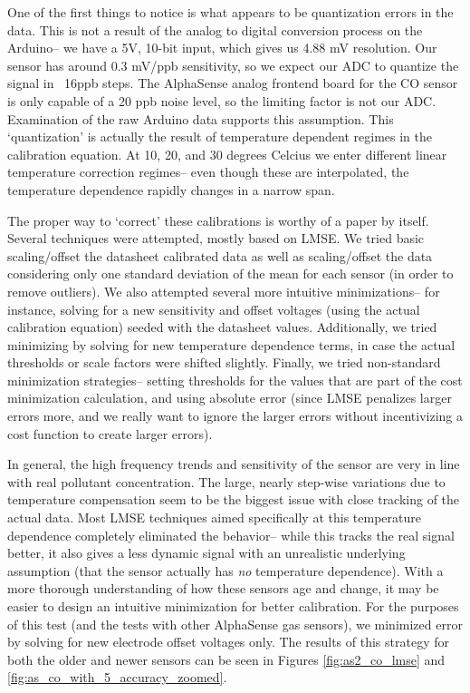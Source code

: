 One of the first things to notice is what appears to be quantization errors in the data.  This is not a result of the analog to digital conversion process on the Arduino-- we have a 5V, 10-bit input, which gives us 4.88 mV resolution.  Our sensor has around 0.3 mV/ppb sensitivity, so we expect our ADC to quantize the signal in ~16ppb steps.  The AlphaSense analog frontend board for the CO sensor is only capable of a 20 ppb noise level, so the limiting factor is not our ADC.  Examination of the raw Arduino data supports this assumption.  This `quantization' is actually the result of temperature dependent regimes in the calibration equation.  At 10, 20, and 30 degrees Celcius we enter different linear temperature correction regimes-- even though these are interpolated, the temperature dependence rapidly changes in a narrow span.

The proper way to `correct' these calibrations is worthy of a paper by itself.  Several techniques were attempted, mostly based on LMSE.  We tried basic scaling/offset the datasheet calibrated data as well as scaling/offset the data considering only one standard deviation of the mean for each sensor (in order to remove outliers).  We also attempted several more intuitive minimizations-- for instance, solving for a new sensitivity and offset voltages (using the actual calibration equation) seeded with the datasheet values.  Additionally, we tried minimizing by solving for new temperature dependence terms, in case the actual thresholds or scale factors were shifted slightly.  Finally, we tried non-standard minimization strategies-- setting thresholds for the values that are part of the cost minimization calculation, and using absolute error (since LMSE penalizes larger errors more, and we really want to ignore the larger errors without incentivizing a cost function to create larger errors).

In general, the high frequency trends and sensitivity of the sensor are very in line with real pollutant concentration.  The large, nearly step-wise variations due to temperature compensation seem to be the biggest issue with close tracking of the actual data.  Most LMSE techniques aimed specifically at this temperature dependence completely eliminated the behavior-- while this tracks the real signal better, it also gives a less dynamic signal with an unrealistic underlying assumption (that the sensor actually has \textit{no} temperature dependence).  With a more thorough understanding of how these sensors age and change, it may be easier to design an intuitive minimization for better calibration.  For the purposes of this test (and the tests with other AlphaSense gas sensors), we minimized error by solving for new electrode offset voltages only.  The results of this strategy for both the older and newer sensors can be seen in Figures \ref{fig:as2_co_lmse} and \ref{fig:as_co_with_5_accuracy_zoomed}.

